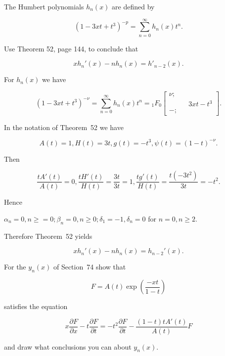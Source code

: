 \begin{problem}\label{problem7chapter8}
The Humbert polynomials $h_n(x)$ are defined by

$$(1-3xt+t^3)^{-p} = \displaystyle\sum_{n=0}^{\infty} h_n(x) t^n.$$

Use Theorem 52, page 144, to conclude that

$$xh_n'(x) - nh_n(x) = h'_{n-2}(x).$$
\end{problem}
\begin{solution}
For $h_n(x)$ we have

$$(1 - 3xt + t^3)^{- \nu} = \displaystyle\sum_{n=0}^{\infty} h_n(x)t^n = {}_1F_0 \left[ \begin{array}{rlr}
\nu; & & \\
& & 3xt-t^3 \\
-; & &
\end{array} \right].$$

In the notation of Theorem~52 we have

$$A(t)=1, H(t)=3t, g(t)=-t^3, \psi(t) = (1-t)^{-\nu}.$$

Then

$$\dfrac{t A'(t)}{A(t)} = 0, \dfrac{t H'(t)}{H(t)} = \dfrac{3t}{3t} = 1, \dfrac{t g'(t)}{H(t)} = \dfrac{t(-3t^2)}{3t} = -t^2.$$

Hence

$\alpha_n=0, n \geq =0; \beta_n=0, n \geq 0; \delta_1=-1, \delta_n=0$ for $n =0, n \geq 2.$

Therefore Theorem~52 yields

$$x h_n'(x) - nh_n(x) = h_{n-2}'(x).$$
\end{solution}
\begin{problem}\label{problem8chapter8}
For the $y_n(x)$ of Section~74 show that

$$F = A(t) \exp \left( \dfrac{-xt}{1-t} \right)$$

satisfies the equation

$$x \dfrac{\partial F}{\partial x} - t \dfrac{\partial F}{\partial t} = -t^2 \dfrac{\partial F}{\partial t} - \dfrac{(1-t)t A'(t)}{A(t)}F$$

and draw what conclusions you can about $y_n(x)$.
\end{problem}

